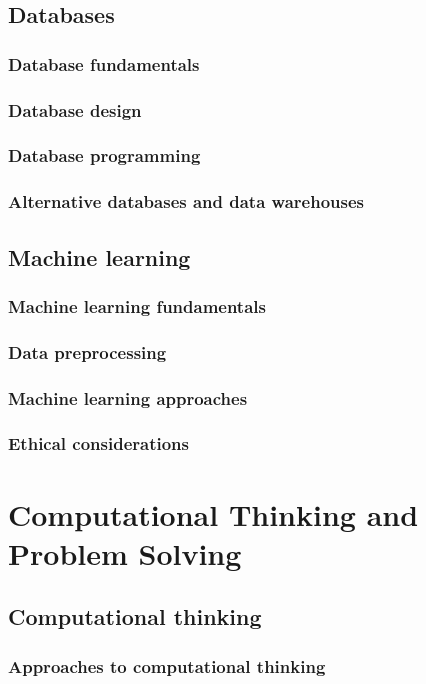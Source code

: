 \documentclass[a4paper,12pt]{article}
\begin{document}
\subsection{Databases}
\subsubsection{Database fundamentals}
\subsubsection{Database design}
\subsubsection{Database programming}
\subsubsection{Alternative databases and data warehouses}
\subsection{Machine learning}
\subsubsection{Machine learning fundamentals}
\subsubsection{Data preprocessing}
\subsubsection{Machine learning approaches}
\subsubsection{Ethical considerations}

\newpage
\section{Computational Thinking and Problem Solving}
\subsection{Computational thinking}
\subsubsection{Approaches to computational thinking}
\end{document}
